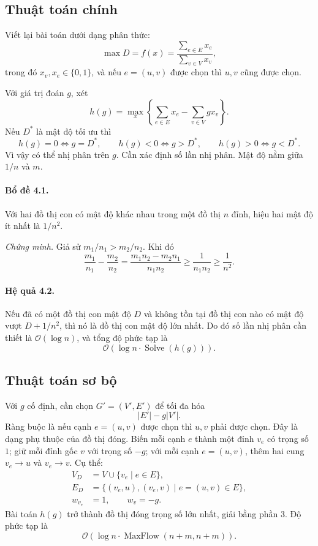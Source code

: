 \documentclass[11pt]{article}
\newcommand{\Oh}{\mathcal{O}}
\begin{document}
\subsection{Thuật toán chính}

Viết lại bài toán dưới dạng phân thức:
\[
  \max D=f(x)=\frac{\sum_{e\in E}x_e}{\sum_{v\in V}x_v},
\]
trong đó \(x_v,x_e\in\{0,1\}\), và nếu \(e=(u,v)\) được chọn thì \(u,v\) cũng
được chọn.

Với giá trị đoán \(g\), xét
\[
  h(g)=\max_x\left\{\sum_{e\in E}x_e-\sum_{v\in V}g x_v\right\}.
\]
Nếu \(D^*\) là mật độ tối ưu thì
\[
  h(g)=0\Leftrightarrow g=D^*,\qquad
  h(g)<0\Leftrightarrow g>D^*,\qquad
  h(g)>0\Leftrightarrow g<D^*.
\]
Vì vậy có thể nhị phân trên \(g\). Cần xác định số lần nhị phân. Mật độ nằm
giữa \(1/n\) và \(m\).

\paragraph{Bổ đề 4.1.}
Với hai đồ thị con có mật độ khác nhau trong một đồ thị \(n\) đỉnh, hiệu hai
mật độ ít nhất là \(1/n^2\).

\emph{Chứng minh.}
Giả sử \(m_1/n_1>m_2/n_2\). Khi đó
\[
  \frac{m_1}{n_1}-\frac{m_2}{n_2}
  =\frac{m_1n_2-m_2n_1}{n_1n_2}
  \ge \frac1{n_1n_2}\ge \frac1{n^2}.
\]

\paragraph{Hệ quả 4.2.}
Nếu đã có một đồ thị con mật độ \(D\) và không tồn tại đồ thị con nào có mật
độ vượt \(D+1/n^2\), thì nó là đồ thị con mật độ lớn nhất. Do đó số lần nhị
phân cần thiết là \(\Oh(\log n)\), và tổng độ phức tạp là
\[
  \Oh(\log n\cdot \operatorname{Solve}(h(g))).
\]

\subsection{Thuật toán sơ bộ}

Với \(g\) cố định, cần chọn \(G'=(V',E')\) để tối đa hóa
\[
  |E'|-g|V'|.
\]
Ràng buộc là nếu cạnh \(e=(u,v)\) được chọn thì \(u,v\) phải được chọn. Đây
là dạng phụ thuộc của đồ thị đóng. Biến mỗi cạnh \(e\) thành một đỉnh \(v_e\)
có trọng số \(1\); giữ mỗi đỉnh gốc \(v\) với trọng số \(-g\); với mỗi cạnh
\(e=(u,v)\), thêm hai cung \(v_e\to u\) và \(v_e\to v\). Cụ thể:
\[
\begin{aligned}
V_D&=V\cup\{v_e\mid e\in E\},\\
E_D&=\{(v_e,u),(v_e,v)\mid e=(u,v)\in E\},\\
w_{v_e}&=1,\qquad w_v=-g.
\end{aligned}
\]
Bài toán \(h(g)\) trở thành đồ thị đóng trọng số lớn nhất, giải bằng phần 3.
Độ phức tạp là
\[
  \Oh(\log n\cdot \operatorname{MaxFlow}(n+m,n+m)).
\]
\end{document}
